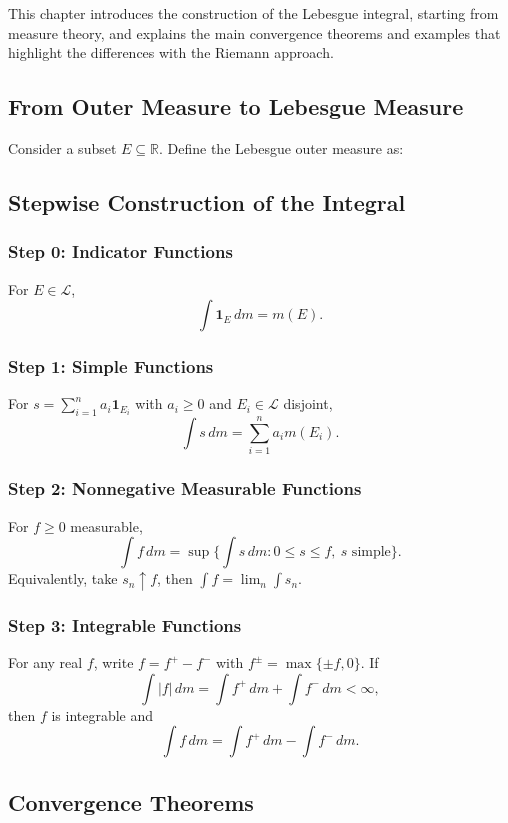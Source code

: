 
This chapter introduces the construction of the Lebesgue integral, starting from measure theory, and explains the main convergence theorems and examples that highlight the differences with the Riemann approach.

\subsection*{From Outer Measure to Lebesgue Measure}
Consider a subset $E \subseteq \mathbb{R}$. Define the Lebesgue outer measure as:

\subsection*{Stepwise Construction of the Integral}

\subsubsection*{Step 0: Indicator Functions}
For $E \in \mathcal{L}$,
\[
\int \mathbf{1}_E \, dm = m(E).
\]

\subsubsection*{Step 1: Simple Functions}
For $s = \sum_{i=1}^n a_i \mathbf{1}_{E_i}$ with $a_i \ge 0$ and $E_i \in \mathcal{L}$ disjoint,
\[
\int s \, dm = \sum_{i=1}^n a_i m(E_i).
\]

\subsubsection*{Step 2: Nonnegative Measurable Functions}
For $f \ge 0$ measurable,
\[
\int f \, dm = \sup\Big\{ \int s \, dm : 0 \le s \le f,\ s \text{ simple}\Big\}.
\]
Equivalently, take $s_n \uparrow f$, then $\int f = \lim_n \int s_n$.

\subsubsection*{Step 3: Integrable Functions}
For any real $f$, write $f = f^+ - f^-$ with $f^\pm = \max\{\pm f,0\}$. If
\[
\int |f|\,dm = \int f^+\,dm + \int f^-\,dm < \infty,
\]
then $f$ is integrable and
\[
\int f\,dm = \int f^+\,dm - \int f^-\,dm.
\]

\subsection*{Convergence Theorems}

